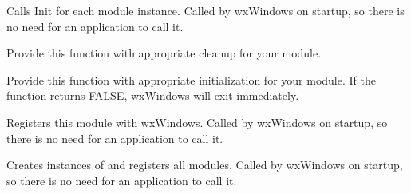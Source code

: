 \label{wxmoduleinitializemodules}


Calls Init for each module instance. Called by wxWindows on startup, so there is no
need for an application to call it.

\label{wxmoduleonexit}


Provide this function with appropriate cleanup for your module.

\label{wxmoduleoninit}


Provide this function with appropriate initialization for your module. If the function
returns FALSE, wxWindows will exit immediately.

\label{wxmoduleregistermodule}


Registers this module with wxWindows. Called by wxWindows on startup, so there is no
need for an application to call it.

\label{wxmoduleregistermodules}


Creates instances of and registers all modules. Called by wxWindows on startup, so there is no
need for an application to call it.


